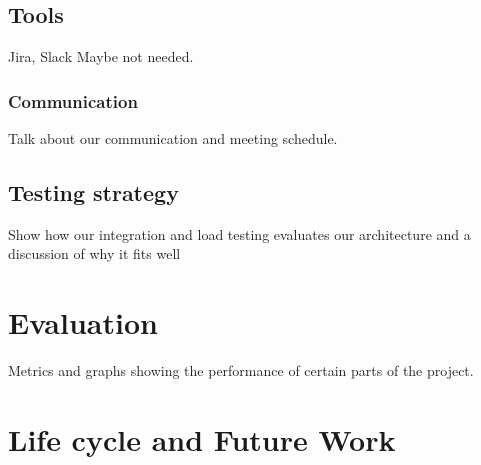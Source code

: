 \documentclass[prodmode,acmtosem]{acmsmall} %
\begin{document}
\subsection{Tools}
Jira, Slack Maybe not needed.

\subsubsection{Communication}
Talk about our communication and meeting schedule.

\subsection{Testing strategy}
Show how our integration and load testing evaluates our architecture and a discussion of why it fits well

\section{Evaluation}
Metrics and graphs showing the performance of certain parts of the project.

\iffalse
\begin{figure}
\centering
\begin{subfigure}{.5\textwidth}
  \centering
  \texttt{[image: image1]}
  \caption{A subfigure}
  \label{fig:sub1}
\end{subfigure}%
\begin{subfigure}{.5\textwidth}
  \centering
  \texttt{[image: image1]}
  \caption{A subfigure}
  \label{fig:sub2}
\end{subfigure}
\caption{A figure with two subfigures}
\label{fig:test}

\begin{subfigure}{.5\textwidth}
  \centering
  \texttt{[image: image1]}
  \caption{A subfigure}
  \label{fig:sub1}
\end{subfigure}%
\begin{subfigure}{.5\textwidth}
  \centering
  \texttt{[image: image1]}
  \caption{A subfigure}
  \label{fig:sub2}
\end{subfigure}
\caption{A figure with two subfigures}
\label{fig:test}
\end{figure}
\fi

\section{Life cycle and Future Work}
\end{document}
